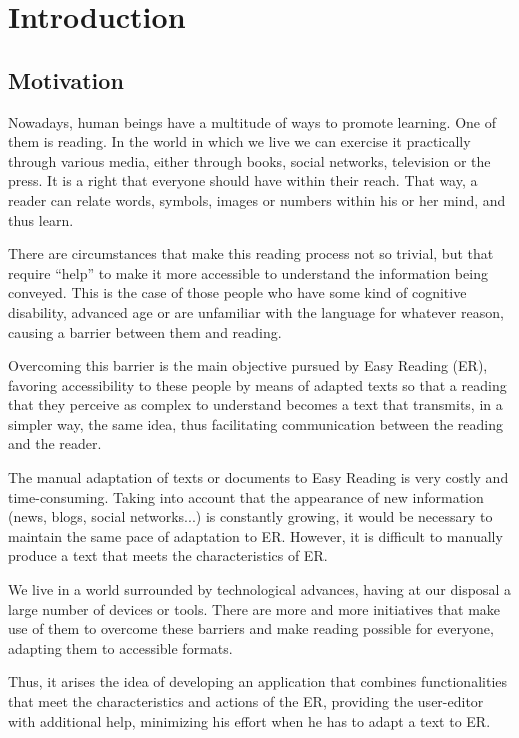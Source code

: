 \chapter{Introduction}
\label{cap:introduction}

\section{Motivation}
Nowadays, human beings have a multitude of ways to promote learning. One of them is reading. In the world in which we live we can exercise it practically through various media, either through books, social networks, television or the press. It is a right that everyone should have within their reach. That way, a reader can relate words, symbols, images or numbers within his or her mind, and thus learn.

There are circumstances that make this reading process not so trivial, but that require ``help'' to make it more accessible to understand the information being conveyed. This is the case of those people who have some kind of cognitive disability, advanced age or are unfamiliar with the language for whatever reason, causing a barrier between them and reading.

Overcoming this barrier is the main objective pursued by Easy Reading (ER), favoring accessibility to these people by means of adapted texts so that a reading that they perceive as complex to understand becomes a text that transmits, in a simpler way, the same idea, thus facilitating communication between the reading and the reader.


The manual adaptation of texts or documents to Easy Reading is very costly and time-consuming. Taking into account that the appearance of new information (news, blogs, social networks...) is constantly growing, it would be necessary to maintain the same pace of adaptation to ER. However, it is difficult to manually produce a text that meets the characteristics of ER. 

We live in a world surrounded by technological advances, having at our disposal a large number of devices or tools. There are more and more initiatives that make use of them to overcome these barriers and make reading possible for everyone, adapting them to accessible formats. 


Thus, it arises the idea of developing an application that combines functionalities that meet the characteristics and actions of the ER, providing the user-editor with additional help, minimizing his effort when he has to adapt a text to ER.


